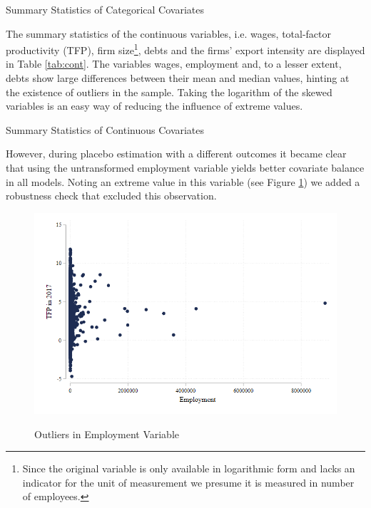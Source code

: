 \documentclass[a4paper,11pt]{scrartcl}
\begin{document}
\begin{table}[h!]
	\centering
	\caption{Summary Statistics of Categorical Covariates} 
	
	\label{tab:cat}	
\end{table}

The summary statistics of the continuous variables, i.e. wages,  total-factor productivity (TFP), firm size\footnote{Since the original variable is only available in logarithmic form and lacks an indicator for the unit of measurement we presume it is measured in number of employees.}, debts and the firms' export intensity are displayed in Table \ref{tab:cont}. The variables wages, employment and, to a lesser extent, debts show large differences between their mean and median values, hinting at the existence of outliers in the sample. Taking the logarithm of the skewed variables is an easy way of reducing the influence of extreme values. 

\begin{table}[h!]
	\centering
	\caption{Summary Statistics of Continuous Covariates} 
	
	\label{tab:cont}
\end{table}

However, during placebo estimation with a different outcomes it became clear that using the untransformed employment variable yields better covariate balance in all models. Noting an extreme value in this variable (see Figure \ref{fig:outliers}) we added a robustness check that excluded this observation. 

\begin{figure}[h!]\centering
	\caption{Outliers in Employment Variable}
	\includegraphics[width=\textwidth]{emp15_outliers}
  	\label{fig:outliers}
\end{figure} 
\end{document}
